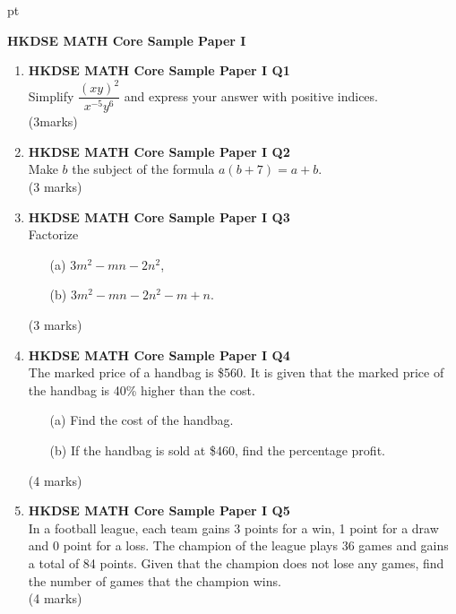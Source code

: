 \documentclass[12pt]{article}
\begin{document}
 pt
\begin{center}
	{\large \bf HKDSE MATH Core Sample Paper I}\\
	\vspace{2 mm}
\end{center}
\vspace{0.05cm}

\begin{enumerate}
	\item \textbf{HKDSE MATH Core Sample Paper I Q1}\\
	Simplify $\dfrac{(xy)^2}{x^{-5}y^6}$ and express your answer with positive indices. \\(3marks)

	\item \textbf{HKDSE MATH Core Sample Paper I Q2}\\
	Make $b$ the subject of the formula $a(b+7) = a+b$. \\(3 marks)

	\item \textbf{HKDSE MATH Core Sample Paper I Q3}\\
	Factorize 
	\begin{enumerate}
		\item[(a)] $3m^2-mn-2n^2$,
		\item[(b)] $3m^2-mn-2n^2-m+n$.
	\end{enumerate} (3 marks)

	\item \textbf{HKDSE MATH Core Sample Paper I Q4}\\
	The marked price of a handbag is \$560. It is  given that the marked price of the handbag is 40\% higher than the cost.
	\begin{enumerate}
		\item[(a)] Find the cost of the handbag.
		\item[(b)] If the handbag is sold at \$460, find the percentage profit.
	\end{enumerate} (4 marks)

	\item \textbf{HKDSE MATH Core Sample Paper I Q5}\\
	In a football league, each team gains 3 points for a win, 1 point for a draw and 0 point for a loss. The champion of the league plays 36 games and gains a total of 84 points. Given that the champion does not lose any games, find the number of games that the champion wins. \\(4 marks)
	

\end{enumerate}
\end{document}
